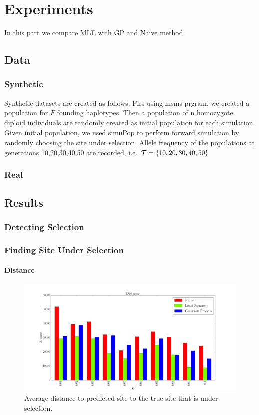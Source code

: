 \section{Experiments}
In this part we compare MLE with GP and Naive method. 
\subsection{Data}
\subsubsection{Synthetic}
Synthetic datasets are created as follows. Firs using msms prgram, we created a population for $F$ founding haplotypes. Then a population of n homozygote diploid individuals are randomly created as initial population for each simulation. Given initial population, we used simuPop to perform forward simulation by randomly choosing the site under selection. Allele frequency of the populations at generations 10,20,30,40,50 are recorded, i.e. ${\cal T}=\{10,20,30,40,50\}$
\subsubsection{Real}

\subsection{Results}
\subsubsection{Detecting Selection}
\subsubsection{Finding Site Under Selection}
\paragraph{Distance}
\begin{figure}[H]
  \centering
    \includegraphics[width=\textwidth]{dist}
  \caption{Average distance to predicted site to the true site that is under selection.}
  \label{fig:Fig1}
\end{figure}

